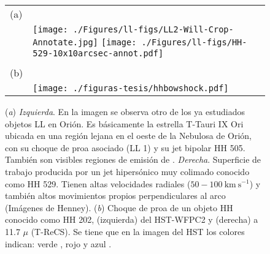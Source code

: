 \begin{figure}[htp]
\centering
\begin{tabular}{l l}
(a) & \\
 & \texttt{[image: ./Figures/ll-figs/LL2-Will-Crop-Annotate.jpg]}
\texttt{[image: ./Figures/ll-figs/HH-529-10x10arcsec-annot.pdf]}
\\
& \\[2\baselineskip]
(b) & \\
& \texttt{[image: ./figuras-tesis/hhbowshock.pdf]}
\\
\end{tabular}
\caption{(\textit{a}) \textit{Izquierda}. En la imagen se observa otro de los ya estudiados objetos LL en Orión. Es básicamente la estrella T-Tauri IX Ori ubicada en una región lejana en el oeste de la Nebulosa de Orión, con su choque de proa asociado (LL 1) y su jet bipolar HH 505. También son visibles regiones de emisión de \oiii{}. \textit{Derecha}. Superficie de trabajo producida por un jet hipersónico muy colimado conocido como HH 529. Tienen altas velocidades radiales (\(50-100 ~\text{km}~\text{s}^{-1}\)) y también altos  movimientos propios perpendiculares al arco (Imágenes de Henney). (\textit{b}) Choque de proa de un objeto HH conocido como HH 202, (izquierda) del HST-WFPC2 y (derecha) a 11.7 \(\mu\) (T-ReCS). Se tiene que en la imagen del HST los colores indican: verde \ha{}, rojo \nii{} y azul \oiii{} \citep{Smith:2005}.}\label{fig:objecthh}
\end{figure}


